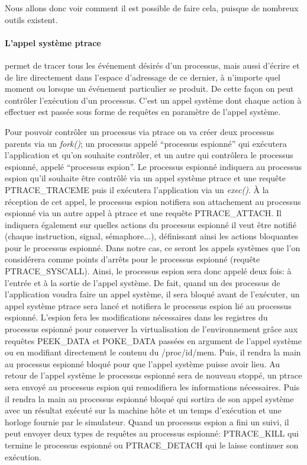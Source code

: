  Nous allons donc voir comment il est possible de faire cela, puisque de
 nombreux outils existent.
 
 \paragraph{L'appel système ptrace}\cite{INTERCEPTION:AS, INTERCEPTION:MARION}
 permet de tracer tous les événement désirés d'un processus, mais aussi d'écrire
 et de lire directement dans l'espace d'adressage de ce dernier, à n'importe
 quel moment ou lorsque un événement particulier se produit. De cette façon on
 peut contrôler l'exécution d'un processus. C'est un appel système dont chaque
 action à effectuer est passée sous forme de requêtes en paramètre de l'appel
 système.

Pour pouvoir contrôler un processus via ptrace on va créer deux processus
parents via un \textit{fork()}; un processus appelé ``processus espionné'' qui
exécutera l'application et qu'on souhaite contrôler, et un autre qui contrôlera
le processus espionné, appelé ``processus espion''. Le processus espionné
indiquera au processus espion qu'il souhaite être contrôlé via un appel système
ptrace et une requête PTRACE\_TRACEME puis il exécutera l'application via un
\textit{exec()}. À la réception de cet appel, le processus espion notifiera son
attachement au processus espionné via un autre appel à ptrace et une requête
PTRACE\_ATTACH. Il indiquera également sur quelles actions du processus espionné
il veut être notifié (chaque instruction, signal, sémaphore...), définissant
ainsi les actions bloquantes pour le processus espionné. Dans notre cas, ce
seront les appels systèmes que l'on considérera comme points d'arrêts pour le
processus espionné (requête PTRACE\_SYSCALL). Ainsi, le processus espion sera
donc appelé deux fois: à l'entrée et à la sortie de l'appel système. De fait,
quand un des processus de l'application voudra faire un appel système, il sera
bloqué avant de l'exécuter, un appel système ptrace sera lancé et notifiera le
processus espion lié au processus espionné. L'espion fera les modifications
nécessaires dans les registres du processus espionné pour conserver la
virtualisation de l'environnement grâce aux requêtes PEEK\_DATA et POKE\_DATA
passées en argument de l'appel système {\color{red}ou en modifiant directement
  le contenu du /proc/id/mem}. Puis, il rendra la main au processus espionné
bloqué pour que l'appel système puisse avoir lieu. Au retour de l'appel système
le processus espionné sera de nouveau stoppé, un ptrace sera envoyé au processus
espion qui remodifiera les informations nécessaires. Puis il rendra la main au
processus espionné bloqué qui sortira de son appel système avec un résultat
exécuté sur la machine hôte et un temps d'exécution et une horloge fournie par
le simulateur. Quand un processus espion a fini un suivi, il peut envoyer deux
types de requêtes au processus espionné: PTRACE\_KILL qui termine le processus
espionné ou PTRACE\_DETACH qui le laisse continuer son exécution.

